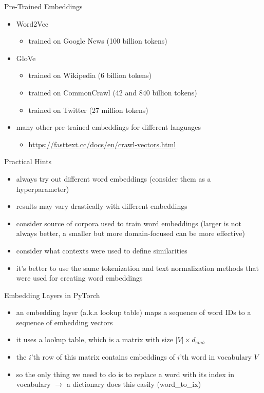  \begin{frame}{Pre-Trained Embeddings}
\begin{itemize}
    \item Word2Vec
    \begin{itemize}
        \item trained on Google News (100 billion tokens)
    \end{itemize}
    \item GloVe
        \begin{itemize}
            \item trained on Wikipedia (6 billion tokens)
            \item trained on CommonCrawl (42 and 840 billion tokens)
            \item trained on Twitter (27 million tokens)
        \end{itemize}
    \item many other pre-trained embeddings for different languages 
        \begin{itemize}
            \item \url{https://fasttext.cc/docs/en/crawl-vectors.html}
        \end{itemize}
\end{itemize}
\end{frame}
 \begin{frame}{Practical Hints}
     \begin{itemize}
         \item<1-> always try out different word embeddings (consider them as a hyperparameter)
         \item<2-> results may vary drastically with different embeddings
         \item<3-> consider source of corpora used to train word embeddings (larger is not always better, a smaller but more domain-focused can be more effective)
         \item<4-> consider what contexts  were used to define similarities 
         \item<5-> it's better to use the same tokenization and text normalization methods that  were used for creating word embeddings
     \end{itemize}
 \end{frame}

 \begin{frame}{Embedding Layers in PyTorch}
     \begin{itemize}
         \item<1-> an embedding layer (a.k.a lookup table) maps a sequence of word IDs to a sequence of embedding vectors
         \item<2-> it uses a lookup table, which is a matrix with size $|V|\times d_{emb}$
         \item<3-> the $i$'th row of this matrix contains embeddings of $i$'th word in vocabulary $V$
         \item<4-> so the only thing we need to do is to replace a word with its index in vocabulary $\rightarrow$ a dictionary does this easily (word\_to\_ix)
     \end{itemize}
     
 \end{frame}

